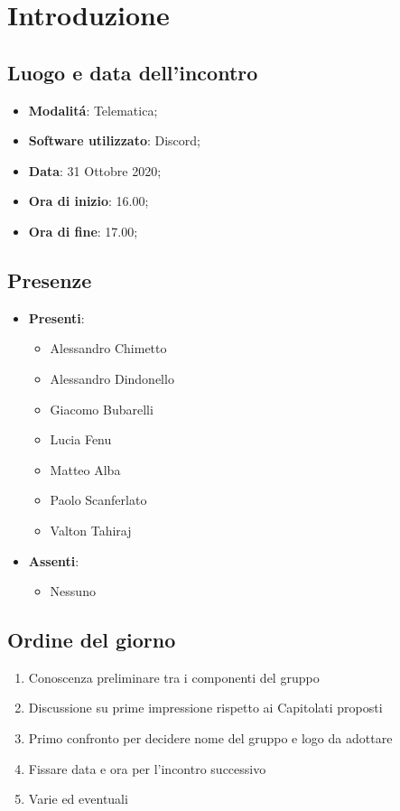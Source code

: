 \documentclass[]{article}
\begin{document}
	
	
	
	\newpage


	\section{Introduzione}
	\subsection{Luogo e data dell'incontro}
	\begin{itemize}
		\item \textbf{Modalitá}: Telematica;
		\item \textbf{Software utilizzato}: Discord;
		\item \textbf{Data}: 31 Ottobre 2020;
		\item \textbf{Ora di inizio}: 16.00;
		\item \textbf{Ora di fine}: 17.00;
	\end{itemize}

	\subsection{Presenze}
	\begin{itemize}
		\item \textbf{Presenti}: 
		\begin{itemize}
			\item Alessandro Chimetto
			\item Alessandro Dindonello
			\item Giacomo Bubarelli
			\item Lucia Fenu
			\item Matteo Alba
			\item Paolo Scanferlato
			\item Valton Tahiraj
		\end{itemize}
		\item \textbf{Assenti}:
		\begin{itemize}
			\item Nessuno
		\end{itemize}
	\end{itemize}


	\subsection{Ordine del giorno}
	\begin{enumerate}
		\item Conoscenza preliminare tra i componenti del gruppo
		\item Discussione su prime impressione rispetto ai Capitolati proposti
		\item Primo confronto per decidere nome del gruppo e logo da adottare
		\item Fissare data e ora per l'incontro successivo
		\item Varie ed eventuali
	\end{enumerate}
\end{document}
